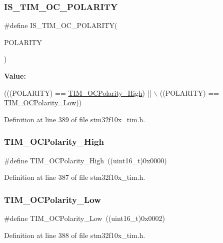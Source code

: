 \subsubsection{\texorpdfstring{I\+S\+\_\+\+T\+I\+M\+\_\+\+O\+C\+\_\+\+P\+O\+L\+A\+R\+I\+TY}{IS\_TIM\_OC\_POLARITY}}
{\footnotesize\ttfamily \#define I\+S\+\_\+\+T\+I\+M\+\_\+\+O\+C\+\_\+\+P\+O\+L\+A\+R\+I\+TY(\begin{DoxyParamCaption}\item[{}]{P\+O\+L\+A\+R\+I\+TY }\end{DoxyParamCaption})}

{\bfseries Value\+:}
\begin{DoxyCode}
(((POLARITY) == \hyperlink{group___t_i_m___output___compare___polarity_gaba2f2de6fd722b8973e0eddeb8644022}{TIM\_OCPolarity\_High}) || \(\backslash\)
                                      ((POLARITY) == \hyperlink{group___t_i_m___output___compare___polarity_ga9f4b11953dbd2c6f836b6913469dcf54}{TIM\_OCPolarity\_Low}))
\end{DoxyCode}


Definition at line 389 of file stm32f10x\+\_\+tim.\+h.

\mbox{\label{group___t_i_m___output___compare___polarity_gaba2f2de6fd722b8973e0eddeb8644022}} 
\subsubsection{\texorpdfstring{T\+I\+M\+\_\+\+O\+C\+Polarity\+\_\+\+High}{TIM\_OCPolarity\_High}}
{\footnotesize\ttfamily \#define T\+I\+M\+\_\+\+O\+C\+Polarity\+\_\+\+High~((uint16\+\_\+t)0x0000)}



Definition at line 387 of file stm32f10x\+\_\+tim.\+h.

\mbox{\label{group___t_i_m___output___compare___polarity_ga9f4b11953dbd2c6f836b6913469dcf54}} 
\subsubsection{\texorpdfstring{T\+I\+M\+\_\+\+O\+C\+Polarity\+\_\+\+Low}{TIM\_OCPolarity\_Low}}
{\footnotesize\ttfamily \#define T\+I\+M\+\_\+\+O\+C\+Polarity\+\_\+\+Low~((uint16\+\_\+t)0x0002)}



Definition at line 388 of file stm32f10x\+\_\+tim.\+h.

